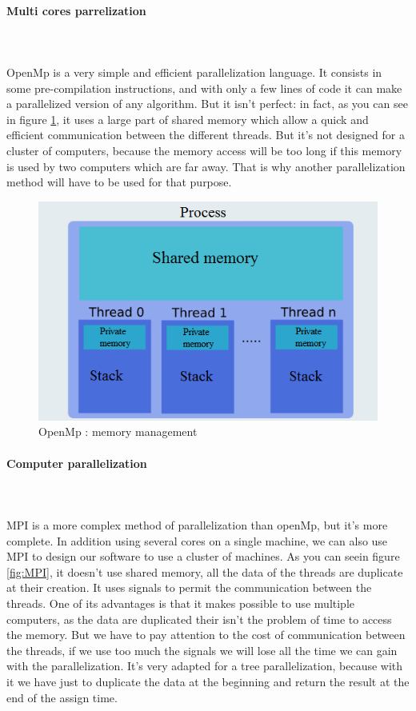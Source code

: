 \paragraph{Multi cores parrelization}\mbox{}\\\mbox{}\\
OpenMp is a very simple and efficient parallelization language. It consists in some pre-compilation instructions, and with only a few lines of code it can make a parallelized version of any algorithm. But it isn't perfect: in fact, as you can see in figure \ref{fig:OpenMp}, it uses a large part of shared memory which allow a quick and efficient communication between the different threads. But it's not designed for a cluster of computers, because the memory access will be too long if this memory is used by two computers which are far away. That is why another parallelization method will have to be used for that purpose.
\begin{figure}[!h] 
\centerline{\includegraphics[scale=0.50]{3_Software_considered/MultithreadingMP_boost_Visual_MPI_5000_Zotero_Project_Baptiste/OpenMP}}
   \caption{\label{étiquette} OpenMp : memory management}
\label{fig:OpenMp}
\end{figure}
\newpage
\paragraph{Computer parallelization}\mbox{}\\\mbox{}\\

MPI is a more complex method of parallelization than openMp, but it's more complete. In addition using several cores on a single machine, we can also use MPI to design our software to use a cluster of machines. As you can seein figure \ref{fig:MPI}, it doesn't use shared memory, all the data of the threads are duplicate at their creation. It uses signals to permit the communication between the threads. One of its advantages is that it makes possible to use multiple computers, as the data are duplicated their isn't the problem of time to access the memory. But we have to pay attention to the cost of communication between the threads, if we use too much the signals we will lose all the time we can gain with the parallelization. It's very adapted for a tree parallelization, because with it we have just to duplicate the data at the beginning and return the result at the end of the assign time.

